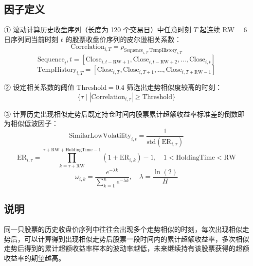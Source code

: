 \documentclass{article}
\begin{document}
\subsection{因子定义}
① 滚动计算历史收盘序列（长度为 120 个交易日）中任意时刻 \( T \) 起连续 \( \mathrm{RW}=6 \) 日序列同当前时刻 \( t \) 的股票收盘价序列的皮尔逊相关系数：
\begin{equation}
    \mathrm{Correlation}_{i,T} = \rho_{\mathrm{Sequence}_{i,t}, \mathrm{TempHistory}_{i,T}}
\end{equation}
\begin{equation}
    \mathrm{Sequence}_{i},t = [\mathrm{Close}_{i,t-\mathrm{RW}+1}, \mathrm{Close}_{i,t-\mathrm{RW}+2}, \dots, \mathrm{Close}_{i,t}]
\end{equation}
\begin{equation}
    \mathrm{TempHistory}_{i,T} = [\mathrm{Close}_{i,T}, \mathrm{Close}_{i,T+1}, \dots, \mathrm{Close}_{i,T+\mathrm{RW}-1}]
\end{equation}

② 设定相关系数的阈值 \( \mathrm{Threshold}=0.4 \) 筛选出走势相似度较高的时刻：
\begin{equation}
    \{ \tau \mid |\mathrm{Correlation}_{i,\tau}| \geq \mathrm{Threshold} \}
\end{equation}

③ 计算历史出现相似走势后既定持仓时间内股票累计超额收益率标准差的倒数即为相似低波因子：
\begin{equation}
    \mathrm{SimilarLowVolatility}_{i,t} = \frac{1}{\mathrm{std}(\mathrm{ER}_{i,\tau})}
\end{equation}
\begin{equation}
    \mathrm{ER}_{i,\tau} = \prod_{k=\tau+\mathrm{RW}}^{\tau+\mathrm{RW}+\mathrm{HoldingTime}-1} (1 + \mathrm{ER}_{i,k}) - 1, \quad 1 < \mathrm{HoldingTime} < \mathrm{RW}
\end{equation}
\begin{equation}
    \omega_{i,k} = \frac{e^{-\lambda k}}{\sum_{k=1}^{n} e^{-\lambda k}}, \quad \lambda = \frac{\ln(2)}{H}
\end{equation}

\subsection{说明}
同一只股票的历史收盘价序列中往往会出现多个走势相似的时刻，每次出现相似走势后，可以计算得到出现相似走势后股票一段时间内的累计超额收益率，多次相似走势后得到的累计超额收益率样本的波动率越低，未来继续持有该股票获得的超额收益率的期望越高。
\end{document}
